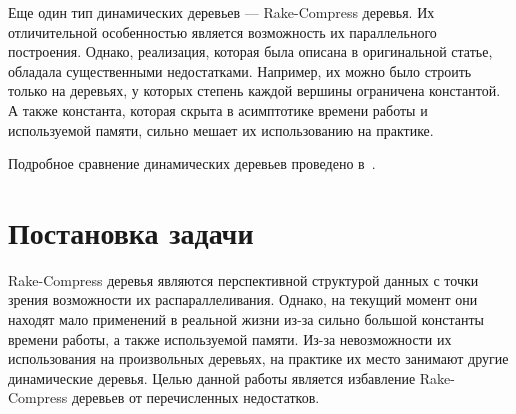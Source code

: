 Еще один тип динамических деревьев --- Rake-Compress деревья. Их отличительной особенностью является возможность их параллельного построения. 
Однако, реализация, которая была описана в оригинальной статье, обладала существенными недостатками. 
Например, их можно было строить только на деревьях, у которых степень каждой вершины ограничена константой. 
А также константа, которая скрыта в асимптотике времени работы и используемой памяти, сильно мешает их использованию на практике.

Подробное сравнение динамических деревьев проведено в~\cite{tarj07}.

\FloatBarrier

\section{Постановка задачи}

Rake-Compress деревья являются перспективной структурой данных с точки зрения возможности их распараллеливания. 
Однако, на текущий момент они находят мало применений в реальной жизни из-за сильно большой константы времени работы, а также используемой памяти.
Из-за невозможности их использования на произвольных деревьях, на практике их место занимают другие динамические деревья.
Целью данной работы является избавление Rake-Compress деревьев от перечисленных недостатков. 



\FloatBarrier
